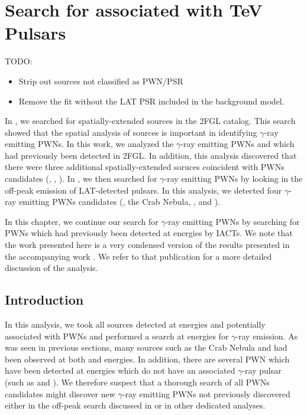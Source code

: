 \chapter{Search for  associated with TeV Pulsars}


TODO:
\begin{itemize}
  \item Strip out sources not classified as PWN/PSR
  \item Remove the fit without the LAT PSR included in the background model.
\end{itemize}

In , we searched for spatially-extended sources
in the 2FGL catalog.  This search showed that the spatial analysis of
\fermi sources is important in identifying $\gamma$-ray emitting \acp{PWN}.
In this work, we analyzed the $\gamma$-ray emitting \acp{PWN} 
and \mshfifteenfiftytwo which had previously been detected in \ac{2FGL}.
In addition, this analysis discovered that there were three additional
spatially-extended \fermi soruces coincident with \acp{PWN} candidates
(, , ).
In , we then searched for $\gamma$-ray emitting \acp{PWN}
by looking in the off-peak emission of \ac{LAT}-detected
pulsars. In this analysis, we detected four $\gamma$-ray emitting \acp{PWN}
candidates (\velax, the Crab Nebula, \mshfifteenfiftytwo, and \threecfiftyeight).

In this chapter, we continue our search for $\gamma$-ray emitting
\acp{PWN} by searching for \acp{PWN} which had previously been detected
at \tev energies by \acp{IACT}. We note that the work presented here is a
very condensed version of the results presented in the accompanying work
\citep{acero_2013a_constraints-galactic}.  We refer to that publication
for a more detailed discussion of the analysis.

\section{Introduction}

In this analysis, we took all sources detected at \tev energies and
potentially associated with \acp{PWN} and performed a search at \gev
energies for $\gamma$-ray emission. As was seen in previous sections,
many sources such as the Crab Nebula and \velax had been observed at
both \gev and \tev energies. In addition, there are several \ac{PWN}
which have been detected at \tev energies which do not have an associated
$\gamma$-ray pulsar (such as  and ).  We therefore
suspect that a thorough search of all \tev \acp{PWN} candidates might
discover new $\gamma$-ray emitting \acp{PWN} not previously discovered
either in the off-peak search discussed in  or in other
dedicated analyses.

